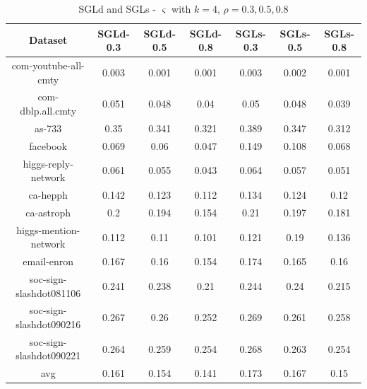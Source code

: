 \documentclass{sig-alternate-2013}
\begin{document}
\begin{table}[!hpp]
\centering
\caption{SGLd and SGLs - $\varsigma$ with $k=4$, $\rho = 0.3, 0.5, 0.8$}
\begin{tabular}{ccccccc}
\hline
Dataset                     &SGLd-0.3       &SGLd-0.5       &SGLd-0.8       &SGLs-0.3       &SGLs-0.5       &SGLs-0.8\\
\hline
com-youtube-all-cmty&0.003&0.001&0.001&0.003&0.002&0.001\\
com-dblp.all.cmty&0.051&0.048&0.04&0.05&0.048&0.039\\
as-733&0.35&0.341&0.321&0.389&0.347&0.312\\
facebook&0.069&0.06&0.047&0.149&0.108&0.068\\
higgs-reply-network&0.061&0.055&0.043&0.064&0.057&0.051\\
ca-hepph&0.142&0.123&0.112&0.134&0.124&0.12\\
ca-astroph&0.2&0.194&0.154&0.21&0.197&0.181\\
higgs-mention-network&0.112&0.11&0.101&0.121&0.19&0.136\\
email-enron&0.167&0.16&0.154&0.174&0.165&0.16\\
soc-sign-slashdot081106&0.241&0.238&0.21&0.244&0.24&0.215\\
soc-sign-slashdot090216&0.267&0.26&0.252&0.269&0.261&0.258\\
soc-sign-slashdot090221&0.264&0.259&0.254&0.268&0.263&0.254\\
\hline
avg&0.161&0.154&0.141&0.173&0.167&0.15\\
\hline
\end{tabular}
\end{table}
\end{document}
